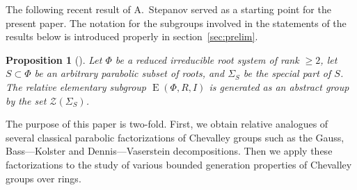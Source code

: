 \documentclass[oneside, 12pt]{amsart}
\theoremstyle{plain}
\numberwithin{equation}{section}
\numberwithin{lemma}{section}
\newtheorem{prop}[lemma]{Proposition}
\theoremstyle{definition}
\theoremstyle{remark}
\DeclareMathOperator{\G}{G}
\DeclareMathOperator{\E}{E}
\DeclareMathOperator{\EP}{EP}
\DeclareMathOperator{\Par}{P}
\DeclareMathOperator{\B}{B}
\DeclareMathOperator{\U}{U}
\begin{document}
The following recent result of A.~Stepanov served as a starting point for the present paper.
The notation for the subgroups involved in the statements of the results below is introduced properly in section~\ref{sec:prelim}.
\begin{prop}[{\cite[Theorem~3.4]{S}}] \label{prop:Stepanov}
Let $\Phi$ be a reduced irreducible root system of rank $\geq 2$, let $S \subset \Phi$ be an arbitrary parabolic subset of roots, and $\Sigma_S$ be the special part of $S$. The relative elementary subgroup $\E(\Phi, R, I)$ is generated as an abstract group by the set $\mathcal{Z}(\Sigma_S)$. \end{prop}

The purpose of this paper is two-fold. 
First, we obtain relative analogues of several classical parabolic factorizations of Chevalley groups such as the Gauss, Bass---Kolster and Dennis---Vaserstein decompositions.
Then we apply these factorizations to the study of various bounded generation properties of Chevalley groups over rings.

\end{document}
